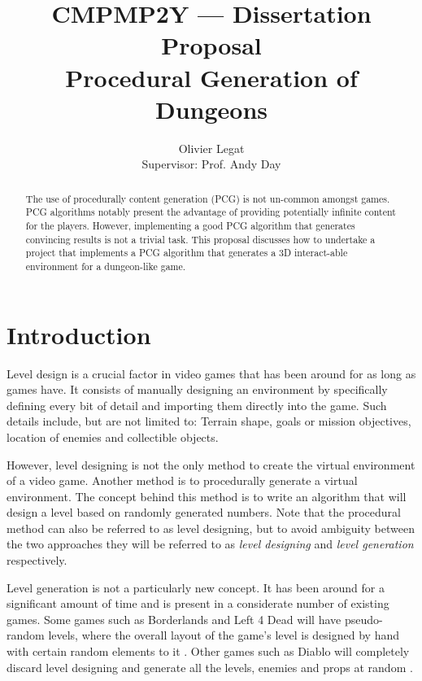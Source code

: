\documentclass{ueacmpstyle}
\begin{document}
\title{CMPMP2Y --- Dissertation Proposal \\ Procedural Generation of Dungeons}
\author{Olivier Legat \\ Supervisor: Prof. Andy Day}
\maketitle

\begin{abstract}
The use of procedurally content generation (PCG) is not un-common amongst games. PCG algorithms notably present the advantage of providing potentially infinite content for the players. However, implementing a good PCG algorithm that generates convincing results is not a trivial task. This proposal discusses how to undertake a project that implements a PCG algorithm that generates a 3D interact-able environment for a dungeon-like game.
\end{abstract}

\pagebreak

\tableofcontents

\pagebreak

\section{Introduction}
Level design is a crucial factor in video games that has been around for as long as games have. It consists of manually designing an environment by specifically defining every bit of detail and importing them directly into the game. Such details include, but are not limited to: Terrain shape, goals or mission objectives, location of enemies and collectible objects.

However, level designing is not the only method to create the virtual environment of a video game. Another method is to procedurally generate a virtual environment. The concept behind this method is to write an algorithm that will design a level based on randomly generated numbers. Note that the procedural method can also be referred to as level designing, but to avoid ambiguity between the two approaches they will be referred to as {\em level designing} and {\em level generation} respectively.

Level generation is not a particularly new concept. It has been around for a significant amount of time and is present in a considerate number of existing games. Some games such as Borderlands and Left 4 Dead will have pseudo-random levels, where the overall layout of the game's level is designed by hand with certain random elements to it \citep{DBLP:journals/tciaig/TogeliusYSB11}. Other games such as Diablo will completely discard level designing and generate all the levels, enemies and props at random \citep{Nitsche-CaseStudy}.
\end{document}
